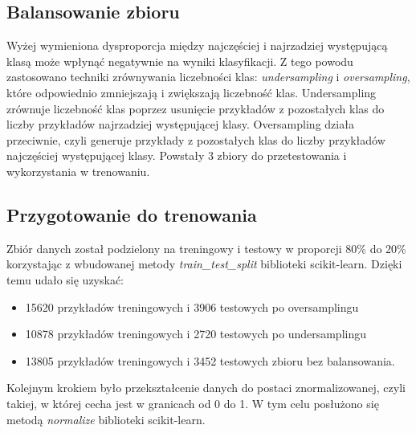 \subsection{Balansowanie zbioru}\label{subsec:balansowanie_zbioru}
Wyżej wymieniona dysproporcja między najczęściej i najrzadziej występującą klasą może wpłynąć negatywnie na wyniki klasyfikacji.
Z tego powodu zastosowano techniki zrównywania liczebności klas: \textit{undersampling} i \textit{oversampling},
które odpowiednio zmniejszają i zwiększają liczebność klas. Undersampling zrównuje liczebność klas
poprzez usunięcie przykładów z pozostałych klas do liczby przykładów najrzadziej występującej klasy.
Oversampling działa przeciwnie, czyli generuje przykłady z pozostałych klas do liczby przykładów najczęściej występującej klasy.
Powstały 3 zbiory do przetestowania i wykorzystania w trenowaniu.
\subsection{Przygotowanie do trenowania}\label{subsec:przygotowanie_do_trenowania}
Zbiór danych został podzielony na treningowy i testowy w proporcji 80\% do 20\%
korzystając z wbudowanej metody \textit{train\_test\_split} biblioteki scikit-learn. Dzięki temu udało się uzyskać:
\begin{itemize}
    \item 15620 przykładów treningowych i 3906 testowych po oversamplingu
    \item 10878 przykładów treningowych i 2720 testowych po undersamplingu
    \item 13805 przykładów treningowych i 3452 testowych zbioru bez balansowania.
\end{itemize}
Kolejnym krokiem było przekształcenie danych do postaci znormalizowanej, czyli takiej, w której cecha jest w granicach od 0 do 1.
W tym celu posłużono się metodą \textit{normalize} biblioteki scikit-learn.
